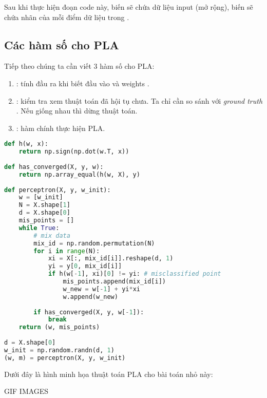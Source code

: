 Sau khi thực hiện đoạn code này, biến  sẽ chứa dữ liệu input (mở rộng), biến  sẽ chứa nhãn của mỗi điểm dữ liệu trong . 
 
\subsection{Các hàm số cho PLA}
Tiếp theo chúng ta cần viết 3 hàm số cho PLA: 
\begin{enumerate}
    \item {}: tính đầu ra khi biết đầu vào  và weights .
    \item {}: kiểm tra xem thuật toán đã hội tụ chưa. Ta chỉ cần so sánh  với \textit{ground truth} . Nếu giống nhau thì dừng thuật toán. 
    \item {}: hàm chính thực hiện PLA. 
\end{enumerate}
 
\begin{lstlisting}[language=Python]
def h(w, x):     
    return np.sign(np.dot(w.T, x)) 
 
def has_converged(X, y, w):     
    return np.array_equal(h(w, X), y)  
 
def perceptron(X, y, w_init): 
    w = [w_init] 
    N = X.shape[1] 
    d = X.shape[0] 
    mis_points = [] 
    while True: 
        # mix data  
        mix_id = np.random.permutation(N) 
        for i in range(N): 
            xi = X[:, mix_id[i]].reshape(d, 1) 
            yi = y[0, mix_id[i]] 
            if h(w[-1], xi)[0] != yi: # misclassified point 
                mis_points.append(mix_id[i]) 
                w_new = w[-1] + yi*xi  
                w.append(w_new) 
                 
        if has_converged(X, y, w[-1]): 
            break 
    return (w, mis_points) 
 
d = X.shape[0] 
w_init = np.random.randn(d, 1) 
(w, m) = perceptron(X, y, w_init) 
\end{lstlisting}
 
Dưới đây là hình minh họa thuật toán PLA cho bài toán nhỏ này: 
 

{\color{red} GIF IMAGES}


